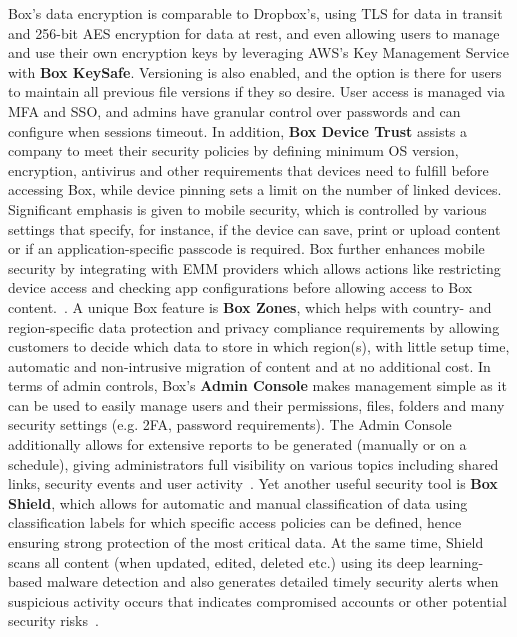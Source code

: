 Box's data encryption is comparable to Dropbox's, using TLS for data in transit and 256-bit AES encryption for data at rest, and even allowing users to manage and use their own encryption keys by leveraging AWS's Key Management Service with \textbf{Box KeySafe}. Versioning is also enabled, and the option is there for users to maintain all previous file versions if they so desire. User access is managed via MFA and SSO, and admins have granular control over passwords and can configure when sessions timeout. In addition, \textbf{Box Device Trust}  assists a company to meet their security policies by defining minimum OS version, encryption, antivirus and other requirements that devices need to fulfill before accessing Box, while device pinning sets a limit on the number of linked devices. Significant emphasis is given to mobile security, which is controlled by various settings that specify, for instance, if the device can save, print or upload content or if an application-specific passcode is required. Box further enhances mobile security by integrating with EMM providers which allows actions like restricting device access and checking app configurations before allowing access to Box content.~\cite{box_mobile,box_emm}. A unique Box feature is \textbf{Box Zones}, which helps with country- and region-specific data protection and privacy compliance requirements by allowing customers to decide which data to store in which region(s), with little setup time, automatic and non-intrusive migration of content and at no additional cost. In terms of admin controls, Box's \textbf{Admin Console} makes management simple as it can be used to easily manage users and their permissions, files, folders and many security settings (e.g. 2FA, password requirements). The Admin Console additionally  allows for extensive reports to be generated (manually or on a schedule), giving administrators full visibility on various topics including shared links, security events and user activity~\cite{box_admin}. Yet another useful security tool is \textbf{Box Shield}, which allows for automatic and manual classification of data using classification labels for which specific access policies can be defined, hence ensuring strong protection of the most critical data. At the same time, Shield scans all content (when updated, edited, deleted etc.) using its deep learning-based malware detection and also generates detailed timely security alerts when suspicious activity occurs that indicates compromised accounts or other potential security risks~\cite{box}.

